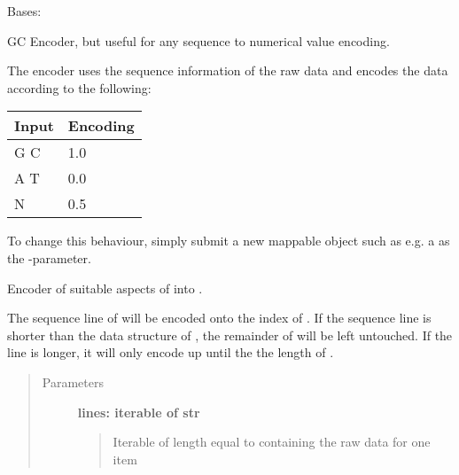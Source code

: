 \documentclass[letterpaper,10pt,english]{sphinxmanual}
\begin{document}

\begin{fulllineitems}
\label{fseq.reading:fseq.reading.seq_encoder.SeqEncoderGC}
Bases: {\hyperref[fseq.reading:fseq.reading.seq_encoder.SeqEncoder]{}}

GC Encoder, but useful for any sequence to numerical value encoding.

The encoder uses the sequence information of the raw data and encodes
the data according to the following:

\begin{tabulary}{\linewidth}{|L|L|}
\hline
\textsf{\relax 
Input
} & \textsf{\relax 
Encoding
}\\
\hline
G C
 & 
1.0
\\
\hline
A T
 & 
0.0
\\
\hline
N
 & 
0.5
\\
\hline\end{tabulary}


To change this behaviour, simply submit a new mappable object such as
e.g. a  as the -parameter.

\begin{fulllineitems}
\label{fseq.reading:fseq.reading.seq_encoder.SeqEncoderGC.parse}
Encoder of suitable aspects of  into .

The sequence line of  will be encoded onto the index
 of .
If the sequence line is shorter than the data structure of
, the remainder of  will be left
untouched.
If the line is longer, it will only encode up until the the length
of .
\begin{quote}\begin{description}
\item[{Parameters}] \leavevmode
\textbf{lines: iterable of str}
\begin{quote}

Iterable of length equal to  containing the
raw data for one item
\end{quote}


\end{description}
\end{quote}
\end{fulllineitems}
\end{fulllineitems}
\end{document}
